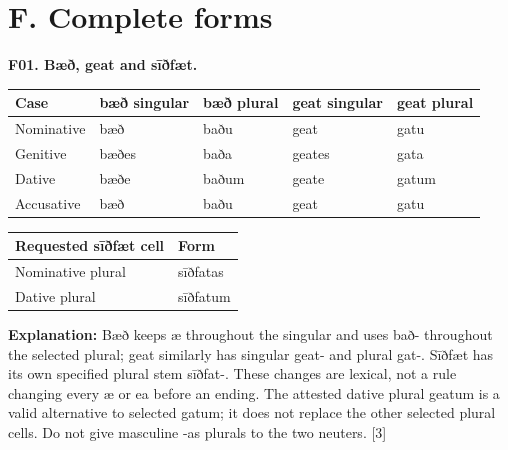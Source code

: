 \clearpage
\section*{F. Complete forms}

\par\begin{minipage}{\linewidth}\raggedright
\textbf{F01. Bæð, geat and sīðfæt.}

\par\begingroup
\fontsize{10.5}{13.2}\selectfont
\setlength{\LTleft}{0pt}\setlength{\LTright}{\fill}
\noindent
\begin{tabular}{@{}>{\raggedright\arraybackslash}p{22.44mm}>{\raggedright\arraybackslash}p{22.44mm}>{\raggedright\arraybackslash}p{22.44mm}>{\raggedright\arraybackslash}p{23.0mm}>{\raggedright\arraybackslash}p{22.44mm}@{}}
\toprule
\textbf{Case} & \textbf{bæð singular} & \textbf{bæð plural} & \textbf{geat singular} & \textbf{geat plural} \\
\midrule
Nominative & bæð & baðu & geat & gatu \\
Genitive & bæðes & baða & geates & gata \\
Dative & bæðe & baðum & geate & gatum \\
Accusative & bæð & baðu & geat & gatu \\
\bottomrule
\end{tabular}
\par\endgroup

\par\begingroup
\fontsize{10.5}{13.2}\selectfont
\setlength{\LTleft}{0pt}\setlength{\LTright}{\fill}
\noindent
\begin{tabular}{@{}>{\raggedright\arraybackslash}p{72.62mm}>{\raggedright\arraybackslash}p{48.57mm}@{}}
\toprule
\textbf{Requested sīðfæt cell} & \textbf{Form} \\
\midrule
Nominative plural & sīðfatas \\
Dative plural & sīðfatum \\
\bottomrule
\end{tabular}
\par\endgroup

\textbf{Explanation:} Bæð keeps æ throughout the singular and uses bað- throughout the selected plural; geat similarly has singular geat- and plural gat-. Sīðfæt has its own specified plural stem sīðfat-. These changes are lexical, not a rule changing every æ or ea before an ending. The attested dative plural geatum is a valid alternative to selected gatum; it does not replace the other selected plural cells. Do not give masculine -as plurals to the two neuters. [3]

\end{minipage}\par\addvspace{4pt}

